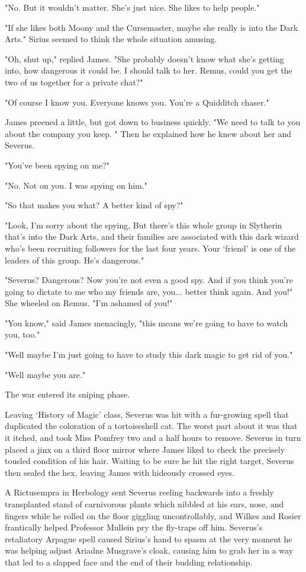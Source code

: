 \documentclass[a4paper,11pt]{article}
\begin{document}
"No. But it wouldn't matter. She's just nice. She likes to help people."

"If she likes both Moony and the Cursemaster, maybe she really is into the Dark Arts." Sirius seemed to think the whole situation amusing.

"Oh, shut up," replied James. "She probably doesn't know what she's getting into, how dangerous it could be. I should talk to her. Remus, could you get the two of us together for a private chat?"

"Of course I know you. Everyone knows you. You're a Quidditch chaser."

James preened a little, but got down to business quickly. "We need to talk to you about the company you keep. " Then he explained how he knew about her and Severus.

"You've been spying on me?"

"No. Not on you. I was spying on him."

"So that makes you what? A better kind of spy?"

"Look, I'm sorry about the spying, But there's this whole group in Slytherin that's into the Dark Arts, and their families are associated with this dark wizard who's been recruiting followers for the last four years. Your `friend' is one of the leaders of this group. He's dangerous."

"Severus? Dangerous? Now you're not even a good spy. And if you think you're going to dictate to me who my friends are, you... better think again. And you!" She wheeled on Remus. "I'm ashamed of you!"

"You know," said James menacingly, "this means we're going to have to watch you, too."

"Well maybe I'm just going to have to study this dark magic to get rid of you."

"Well maybe you are."

The war entered its sniping phase.

Leaving `History of Magic' class, Severus was hit with a fur-growing spell that duplicated the coloration of a tortoiseshell cat. The worst part about it was that it itched, and took Miss Pomfrey two and a half hours to remove. Severus in turn placed a jinx on a third floor mirror where James liked to check the precisely tousled condition of his hair. Waiting to be sure he hit the right target, Severus then sealed the hex, leaving James with hideously crossed eyes.

A Rictusempra in Herbology sent Severus reeling backwards into a freshly transplanted stand of carnivorous plants which nibbled at his ears, nose, and fingers while he rolled on the floor giggling uncontrollably, and Wilkes and Rosier frantically helped Professor Mullein pry the fly-traps off him. Severus's retaliatory Arpague spell caused Sirius's hand to spasm at the very moment he was helping adjust Ariadne Musgrave's cloak, causing him to grab her in a way that led to a slapped face and the end of their budding relationship.
\end{document}
